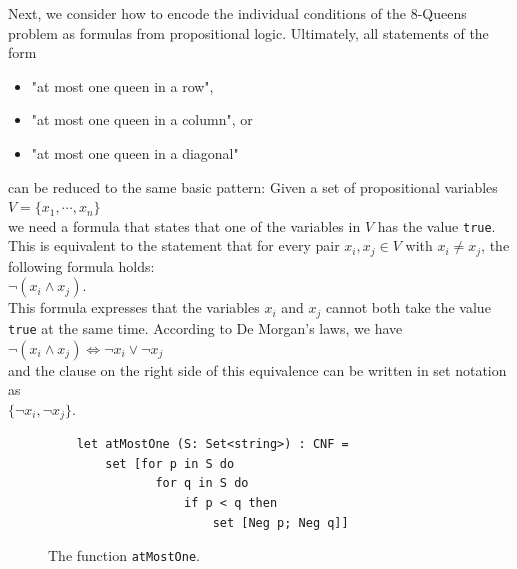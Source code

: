 Next, we consider how to encode the individual conditions of the 8-Queens problem as formulas from
propositional logic. Ultimately, all statements of the form 
\begin{itemize}
\item "at most one queen in a row",
\item "at most one queen in a column", or
\item "at most one queen in a diagonal"
\end{itemize}
can be reduced to the same basic pattern:
Given a set of propositional variables \\[0.2cm]
\hspace*{1.3cm} $V = \{ x_1, \cdots, x_n \}$ \\[0.2cm]
we need a formula that states that  one of the variables in
$V$ has the value \texttt{true}. This is equivalent to the statement that for every pair
$x_i, x_j \in V$ with $x_i \neq x_j$, the following formula holds: \\[0.2cm]
\hspace*{1.3cm} $\neg (x_i \wedge x_j)$. \\[0.2cm]
This formula expresses that the variables $x_i$ and $x_j$ cannot both take the value
\texttt{true} at the same time. According to De Morgan's laws, we have
\\[0.2cm]
\hspace*{1.3cm}
$\neg (x_i \wedge x_j) \Leftrightarrow \neg x_i \vee \neg x_j$
\\[0.2cm]
and the clause on the right side of this equivalence can be written in set notation as
\\[0.2cm]
\hspace*{1.3cm}  $\{\neg x_i, \neg x_j \}$. 

\begin{figure}[!ht]
  \centering
\begin{verbatim}
    let atMostOne (S: Set<string>) : CNF =
        set [for p in S do
               for q in S do
                   if p < q then
                       set [Neg p; Neg q]]
\end{verbatim}
\vspace*{-0.3cm}
  \caption{The function \texttt{atMostOne}.}
  \label{fig:atMostOne}
\end{figure}

